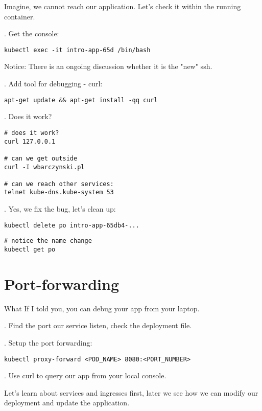 \documentclass[12pt, letterpaper]{article}
\begin{document}
Imagine, we cannot reach our application. Let's check it within the running container.

. Get the console:

\begin{verbatim}
kubectl exec -it intro-app-65d /bin/bash
\end{verbatim}

Notice: There is an ongoing discussion whether it is the "new" ssh.

. Add tool for debugging - curl:

\begin{verbatim}
apt-get update && apt-get install -qq curl
\end{verbatim}

. Does it work?

\begin{verbatim}
# does it work?
curl 127.0.0.1

# can we get outside
curl -I wbarczynski.pl

# can we reach other services:
telnet kube-dns.kube-system 53
\end{verbatim}

. Yes, we fix the bug, let's clean up:

\begin{verbatim}
kubectl delete po intro-app-65db4-...
\end{verbatim}


\begin{verbatim}
# notice the name change
kubectl get po
\end{verbatim}

%
%
%
\section{Port-forwarding}

What If I told you, you can debug your app from your laptop.

. Find the port our service listen, check the deployment file.

. Setup the port forwarding:

\begin{verbatim}
kubectl proxy-forward <POD_NAME> 8080:<PORT_NUMBER>
\end{verbatim}

. Use curl to query our app from your local console.

\bigskip
Let's learn about services and ingresses first, later 
we see how we can modify our deployment and update the application.
\end{document}
